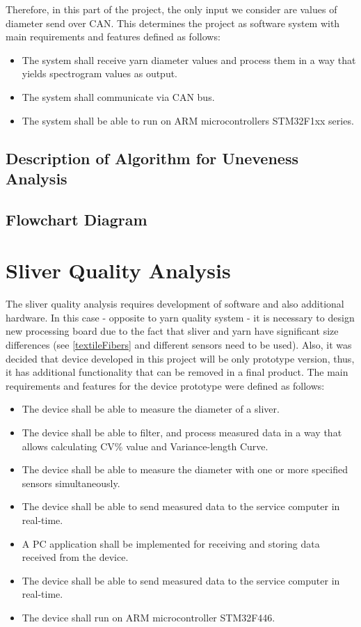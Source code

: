 \documentclass[twoside]{ctuthesis}
\theoremstyle{plain}
\theoremstyle{definition}
\theoremstyle{note}
\begin{document}
Therefore, in this part of the project, the only input we consider are values of diameter send over CAN. This determines the project as software system with main requirements and features defined as follows:
\begin{itemize}
 	\setlength{\itemsep}{5pt}
 	\item The system shall receive yarn diameter values and process them in a way that yields spectrogram values as output.
 	\item The system shall communicate via CAN bus.
 	\item The system shall be able to run on ARM microcontrollers STM32F1xx series.
\end{itemize}

\subsection{Description of Algorithm for Uneveness Analysis}
\subsection{Flowchart Diagram}


\section{Sliver Quality Analysis}
 The sliver quality analysis requires development of software and also additional hardware. In this case - opposite to yarn quality system - it is necessary to design new processing board due to the fact that sliver and yarn have significant size differences (see \ref{textileFibers} and different sensors need to be used). Also, it was decided that device developed in this project will be only prototype version, thus, it has additional functionality that can be removed in a final product. The main requirements and features for the device prototype were defined as follows:
\begin{itemize}
	\setlength{\itemsep}{5pt}
	\item The device shall be able to measure the diameter of a sliver.
	\item The device shall be able to filter, and process measured data in a way that allows calculating CV\% value and Variance-length Curve.
	\item The device shall be able to measure the diameter with one or more specified sensors simultaneously.
	\item The device shall be able to send measured data to the service computer in real-time.
	\item A PC application shall be implemented for receiving and storing data received from the device.
	\item The device shall be able to send measured data to the service computer in real-time.
	\item The device shall run on ARM microcontroller STM32F446.
\end{itemize}
\end{document}
